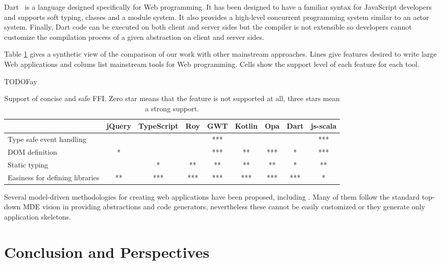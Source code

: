 \documentclass[runningheads,a4paper]{llncs}
\begin{document}
Dart~\cite{Griffith11_Dart} is a language designed specifically for Web programming. It has been designed to have a
familiar syntax for JavaScript developers and supports soft typing, classes and a module system. It also provides a
high-level concurrent programming system similar to an actor system. Finally, Dart code can be executed on both
client and server sides but the compiler is not extensible so developers cannot customize the compilation process of
a given abstraction on client and server sides.

Table \ref{comparison} gives a synthetic view of the comparison of our work with other mainstream approaches. Lines
give features desired to write large Web applications and colums list mainstream tools for Web programming. Cells
show the support level of each feature for each tool.

TODO{Fay}

\begin{table}
\centering
\begin{tabular}{| l | c | c | c | c | c | c | c | c |}
\hline
& jQuery & TypeScript & Roy & GWT & Kotlin & Opa & Dart & js-scala \\
\hline
Type safe event handling & & & & *** & & & & *** \\
\hline
DOM definition & * & & & *** & ** & *** & * & *** \\
\hline
Static typing & & * & ** & ** & ** & ** & * & ** \\
\hline
Easiness for defining libraries & ** & *** & *** & *** & *** & *** & *** & * \\
\hline
\end{tabular}
\caption{Support of concise and safe FFI. Zero star means that the feature is not supported
at all, three stars mean a strong support.}
\label{comparison}
\end{table}

Several model-driven methodologies for creating web applications have been proposed, including
\cite{schwabe1996systematic,lima2003modeling,ceri2000web,koch2001authoring,pastor2003oows,valverde2007mda,vdovjak2003engineering,kraus2007model,nunes2006rapid,brambilla2008designing,valderas2007transformational,van2006hera,Groenewegen08_WebDSL}.
Many of them follow the standard top-down MDE vision in providing abstractions and code generators, nevertheless
these cannot be easily customized or they generate only application skeletons.



\section{Conclusion and Perspectives}




\end{document}
